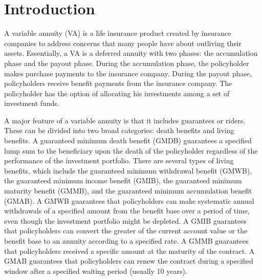 \chapter{Introduction}

A variable annuity (VA) is a life insurance product created by insurance companies to address concerns that many people have about outliving their assets. Essentially, a VA is a deferred annuity with two phases: the accumulation phase and the payout phase. During the accumulation phase, the policyholder makes purchase payments to the insurance company. During the payout phase, policyholders receive benefit payments from the insurance company. The policyholder has the option of allocating his investments among a set of investment funds. 

A major feature of a variable annuity is that it includes guarantees or riders. These can be divided into two broad categories: death benefits and living benefits. A guaranteed minimum death benefit (GMDB) guarantees a specified lump sum to the beneficiary upon the death of the policyholder regardless of the performance of the investment portfolio. There are several types of living benefits, which include the guaranteed minimum withdrawal benefit (GMWB), the guaranteed minimum income benefit (GMIB), the guaranteed minimum maturity benefit (GMMB), and the guaranteed minimum accumulation benefit (GMAB). A GMWB guarantees that policyholders can make systematic annual withdrawals of a specified amount from the benefit base over a period of time, even though the investment portfolio might be depleted. A GMIB guarantees that policyholders can convert the greater of the current account value or the benefit base to an annuity according to a specified rate. A GMMB guarantees that policyholders received a specific amount at the maturity of the contract. A GMAB guarantees that policyholders can renew the contract during a specified window after a specified waiting period (usually 10 years).

